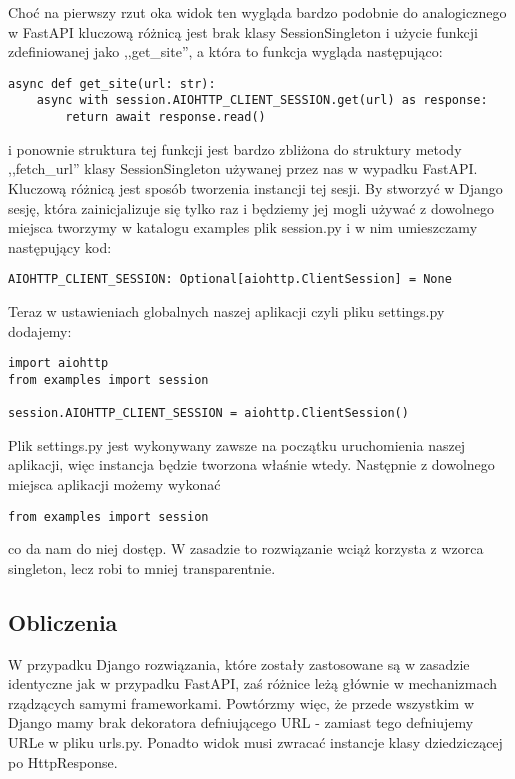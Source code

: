 Choć na pierwszy rzut oka widok ten wygląda bardzo podobnie do analogicznego w FastAPI kluczową różnicą jest brak klasy SessionSingleton i użycie funkcji zdefiniowanej jako ,,get\_site'', a która to funkcja wygląda następująco:
\begin{lstlisting}
async def get_site(url: str):
    async with session.AIOHTTP_CLIENT_SESSION.get(url) as response:
        return await response.read()
\end{lstlisting}
i ponownie struktura tej funkcji jest bardzo zbliżona do struktury metody ,,fetch\_url'' klasy SessionSingleton używanej przez nas w wypadku FastAPI. Kluczową różnicą jest sposób tworzenia instancji tej sesji. By stworzyć w Django sesję, która zainicjalizuje się tylko raz i będziemy jej mogli używać z dowolnego miejsca tworzymy w katalogu examples plik session.py i w nim umieszczamy następujący kod:
\begin{lstlisting}
AIOHTTP_CLIENT_SESSION: Optional[aiohttp.ClientSession] = None
\end{lstlisting}
Teraz w ustawieniach globalnych naszej aplikacji czyli pliku settings.py dodajemy:
\begin{lstlisting}
import aiohttp
from examples import session

session.AIOHTTP_CLIENT_SESSION = aiohttp.ClientSession()
\end{lstlisting}
Plik settings.py jest wykonywany zawsze na początku uruchomienia naszej aplikacji, więc instancja będzie tworzona właśnie wtedy. Następnie z dowolnego miejsca aplikacji możemy wykonać
\begin{lstlisting}
from examples import session
\end{lstlisting}
co da nam do niej dostęp. W zasadzie to rozwiązanie wciąż korzysta z wzorca singleton, lecz robi to mniej transparentnie.

\subsection{Obliczenia}
W przypadku Django rozwiązania, które zostały zastosowane są w zasadzie identyczne jak w przypadku FastAPI, zaś różnice leżą głównie w mechanizmach rządzących samymi frameworkami. Powtórzmy więc, że przede wszystkim w Django mamy brak dekoratora defniującego URL - zamiast tego defniujemy URLe w pliku urls.py. Ponadto widok musi zwracać instancje klasy dziedziczącej po HttpResponse.